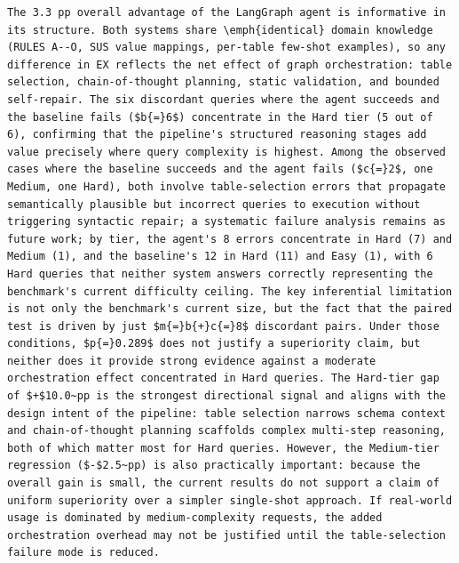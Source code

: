 \documentclass[11pt,a4paper]{article}
\begin{document}
\begin{finalblock}
\begin{lstlisting}[style=texsnippet]
The 3.3 pp overall advantage of the LangGraph agent is informative in its structure. Both systems share \emph{identical} domain knowledge (RULES A--O, SUS value mappings, per-table few-shot examples), so any difference in EX reflects the net effect of graph orchestration: table selection, chain-of-thought planning, static validation, and bounded self-repair. The six discordant queries where the agent succeeds and the baseline fails ($b{=}6$) concentrate in the Hard tier (5 out of 6), confirming that the pipeline's structured reasoning stages add value precisely where query complexity is highest. Among the observed cases where the baseline succeeds and the agent fails ($c{=}2$, one Medium, one Hard), both involve table-selection errors that propagate semantically plausible but incorrect queries to execution without triggering syntactic repair; a systematic failure analysis remains as future work; by tier, the agent's 8 errors concentrate in Hard (7) and Medium (1), and the baseline's 12 in Hard (11) and Easy (1), with 6 Hard queries that neither system answers correctly representing the benchmark's current difficulty ceiling. The key inferential limitation is not only the benchmark's current size, but the fact that the paired test is driven by just $m{=}b{+}c{=}8$ discordant pairs. Under those conditions, $p{=}0.289$ does not justify a superiority claim, but neither does it provide strong evidence against a moderate orchestration effect concentrated in Hard queries. The Hard-tier gap of $+$10.0~pp is the strongest directional signal and aligns with the design intent of the pipeline: table selection narrows schema context and chain-of-thought planning scaffolds complex multi-step reasoning, both of which matter most for Hard queries. However, the Medium-tier regression ($-$2.5~pp) is also practically important: because the overall gain is small, the current results do not support a claim of uniform superiority over a simpler single-shot approach. If real-world usage is dominated by medium-complexity requests, the added orchestration overhead may not be justified until the table-selection failure mode is reduced.
\end{lstlisting}
\end{finalblock}
\end{document}
